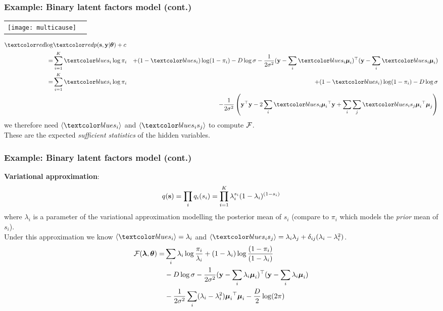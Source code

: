 \begin{frame}
\frametitle{Example: Binary latent factors model (cont.)}
\begin{tabular}{cc}
\texttt{[image: multicause]} & \raisebox{0.45in}{\parbox{2.4in}{
\[
{\cal F}(q,\btheta) = \langle \Red{\log p(\bfs, \bfy|\btheta)} \rangle_{q(\bfs)} -
\langle \log q(\bfs) \rangle_{q(\bfs)} 
\]
}}
\end{tabular}

{\small
\begin{eqnarray*}
\Red{\log} & \Red{p(\bfs,\bfy|\btheta)} +c & \\
=&  \sum_{i=1}^K \Blue{s_i} \log \pi_i & + (1-\Blue{s_i}) \log
(1-\pi_i) - D \log \sigma - \frac{1}{2 \sigma^2} 
(\bfy - \sum_i \Blue{s_i} \bmu_i)\T (\bfy - \sum_i \Blue{s_i} \bmu_i) \\
=& \sum_{i=1}^K \Blue{s_i} \log \pi_i & + (1-\Blue{s_i}) \log
(1-\pi_i) - D \log \sigma \\ & & - \frac{1}{2 \sigma^2} 
\left(\bfy\T \bfy - 2 \sum_i \Blue{s_i} \bmu_i\T \bfy + \sum_i \sum_j \Blue{s_i  s_j}
\bmu_i\T \bmu_j\right) 
\end{eqnarray*}
}
we therefore need $\langle \Blue{s_i} \rangle$  and $\langle \Blue{s_i s_j} \rangle$ to
compute $\cal F$. \\[0.1ex]

These are the expected {\em sufficient statistics} of the hidden variables. 

\end{frame}
\begin{frame}
\frametitle{Example: Binary latent factors model (cont.)}

{\bf Variational approximation}: 
\[
q(\mathbf s)= \prod_i q_i(s_i) = \prod_{i=1}^K \lambda_i^{s_i}
(1-\lambda_i)^{(1-s_i)} 
\]
where $\lambda_i$ is a parameter of the variational approximation
modelling the posterior mean of $s_i$ (compare to $\pi_i$ which models
the {\em prior} mean of $s_i$). \\[1ex]
Under this approximation we know $\langle \Blue{s_i} \rangle = \lambda_i$
and $\langle \Blue{s_i s_j} \rangle = \lambda_i \lambda_j + \delta_{ij}
(\lambda_i - \lambda^2_i)$.
\[
\begin{split}
{\cal F}(\boldsymbol{\lambda},\boldsymbol{\theta})  = &
\sum_i \lambda_i \log \frac{\pi_i}{\lambda_i} +
(1-\lambda_i) \log \frac{(1-\pi_i)}{(1-\lambda_i)} \\
& - D \log \sigma  - \frac{1}{2 \sigma^2}  
(\mathbf y - \sum_i \lambda_i {\boldsymbol{\mu}}_i){\scriptsize^{\top}} (\mathbf y - \sum_i \lambda_i {\boldsymbol{\mu}}_i)  \\
& -\frac{1}{2\sigma^2} \sum_i (\lambda_i - 
\lambda_i^2) {\boldsymbol{\mu}}_i{\scriptsize^{\top}} {\boldsymbol{\mu}}_i  - \frac{D}{2} \log
(2 \pi)
\end{split}
\]

\end{frame}
